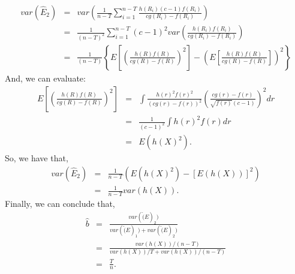 \documentclass{article}\usepackage[]{graphicx}\usepackage[]{color}
\begin{document}
\begin{eqnarray*}
  var(\hat{E}_2) &=& var\left( \frac{1}{n-T} \sum_{i=1}^{n-T} \frac{h(R_i)(c-1)f(R_i)}{cg(R_i)-f(R_i)} \right) \\
  &=& \frac{1}{(n-T)^2}\sum_{i=1}^{n-T}(c-1)^2 var\left(\frac{h(R_i)f(R_i)}{cg(R_i)-f(R_i)}\right) \\
  &=& \frac{1}{(n-T)} \left\{ E\left[ \left( \frac{h(R)f(R)}{cg(R)-f(R)} \right)^2 \right] - \left( E\left[ \frac{h(R)f(R)}{cg(R)-f(R)} \right] \right)^2 \right\}
\end{eqnarray*}
And, we can evaluate:
\begin{eqnarray*}
  E\left[ \left( \frac{h(R)f(R)}{cg(R)-f(R)} \right)^2 \right] &=& \int \frac{h(r)^2f(r)^2}{(cg(r)-f(r))^2}\left( \frac{cg(r)-f(r)}{\sqrt{f(r)}(c-1)} \right)^2 dr \\
  &=& \frac{1}{(c-1)^2}\int h(r)^2 f(r) dr \\
  &=& E(h(X)^2).
\end{eqnarray*}
So, we have that,
\begin{eqnarray*}
  var(\hat{E}_2) &=& \frac{1}{n-T}(E(h(X)^2)-[E(h(X))]^2) \\
  &=& \frac{1}{n-T} var(h(X)).
\end{eqnarray*}
Finally, we can conclude that,
\begin{eqnarray*}
  \hat{b} &=& \frac{var(\hat(E)_2)}{var(\hat(E)_1)+var(\hat(E)_2)} \\
  &=& \frac{var(h(X))/(n-T)}{var(h(X))/T + var(h(X))/(n-T)} \\
  &=& \frac{T}{n}.
\end{eqnarray*}
\end{document}
